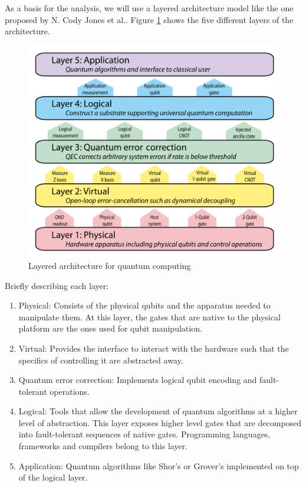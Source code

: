 As a basis for the analysis, we will use a layered architecture model like the one proposed by N. Cody Jones et al.\cite{LayeredArchitectureForQuantum_2012}. Figure \ref{fig:LayeredArchitectureForQuantum} shows the five different layers of the architecture.

\begin{figure}[h!]
    \centering
    \includegraphics[scale=.35]{images/Framework-LayeredArchitecture.png}
    \caption{Layered architecture for quantum computing \cite{LayeredArchitectureForQuantum_2012}}
    \label{fig:LayeredArchitectureForQuantum}
\end{figure}

Briefly describing each layer:
\begin{enumerate}
    \item Physical: Consists of the physical qubits and the apparatus needed to manipulate them. At this layer, the gates that are native to the physical platform are the ones used for qubit manipulation.
    \item Virtual: Provides the interface to interact with the hardware such that the specifics of controlling it are abstracted away.
    \item Quantum error correction: Implements logical qubit encoding and fault-tolerant operations.
    \item Logical: Tools that allow the development of quantum algorithms at a higher level of abstraction. This layer exposes higher level gates that are decomposed into fault-tolerant sequences of native gates. Programming languages, frameworks and compilers belong to this layer.
    \item Application: Quantum algorithms like Shor's or Grover's implemented on top of the logical layer.
\end{enumerate}

